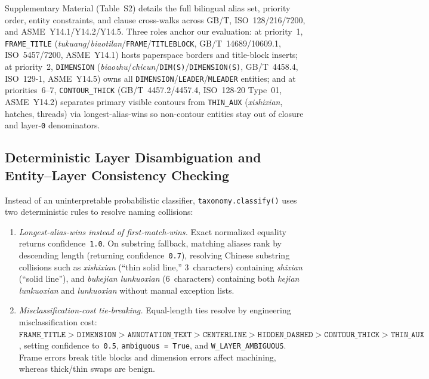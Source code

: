 \documentclass[nocopyright,nolists,upint,varvw,hyphenate]{asmejour}
\begin{document}
Supplementary Material (Table~S2) details the full bilingual alias set, priority order, entity constraints, and clause cross-walks across GB/T, ISO~128/216/7200, and ASME~Y14.1/Y14.2/Y14.5. Three roles anchor our evaluation: at priority~1, \texttt{FRAME\_\allowbreak TITLE} (\emph{tukuang}/\allowbreak\emph{biaotilan}/\allowbreak\texttt{FRAME}/\allowbreak\texttt{TITLEBLOCK}, GB/T~14689/10609.1, ISO~5457/7200, ASME~Y14.1) hosts paperspace borders and title-block inserts; at priority~2, \texttt{DIMENSION} (\emph{biaozhu}/\allowbreak\emph{chicun}/\allowbreak\texttt{DIM(S)}/\allowbreak\texttt{DIMENSION(S)}, GB/T~4458.4, ISO~129-1, ASME~Y14.5) owns all \texttt{DIMENSION}/\allowbreak\texttt{LEADER}/\allowbreak\texttt{MLEADER} entities; and at priorities~6--7, \texttt{CONTOUR\_\allowbreak THICK} (GB/T~4457.2/4457.4, ISO~128-20 Type~01, ASME~Y14.2) separates primary visible contours from \texttt{THIN\_AUX} (\emph{xishixian}, hatches, threads) via longest-alias-wins so non-contour entities stay out of closure and layer-\texttt{0} denominators.

\subsection{Deterministic Layer Disambiguation and Entity--Layer Consistency Checking}\label{sec:disambiguation}

Instead of an uninterpretable probabilistic classifier, \texttt{taxonomy.classify()} uses two deterministic rules to resolve naming collisions:

\begin{enumerate}
\item \emph{Longest-alias-wins instead of first-match-wins.} Exact normalized equality returns confidence~\texttt{1.0}. On substring fallback, matching aliases rank by descending length (returning confidence~\texttt{0.7}), resolving Chinese substring collisions such as \emph{xishixian} (``thin solid line,'' 3~characters) containing \emph{shixian} (``solid line''), and \emph{bukejian lunkuoxian} (6~characters) containing both \emph{kejian lunkuoxian} and \emph{lunkuoxian} without manual exception lists.
\item \emph{Misclassification-cost tie-breaking.} Equal-length ties resolve by engineering misclassification cost: $\texttt{FRAME\_TITLE} > \texttt{DIMENSION} > \texttt{ANNOTATION\_TEXT} > \texttt{CENTERLINE} > \texttt{HIDDEN\_DASHED} > \texttt{CONTOUR\_THICK} > \texttt{THIN\_AUX}$, setting confidence to~\texttt{0.5}, \texttt{ambiguous = True}, and \texttt{W\_LAYER\_AMBIGUOUS}. Frame errors break title blocks and dimension errors affect machining, whereas thick/thin swaps are benign.
\end{enumerate}
\end{document}

